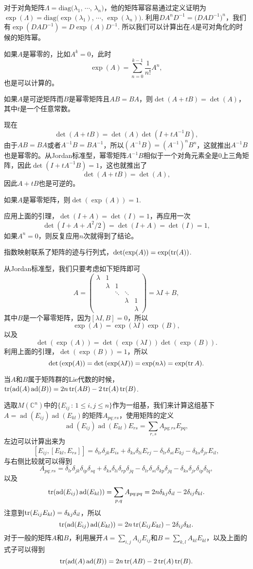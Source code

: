 \documentclass[11pt]{article}
\theoremstyle{definition}
\theoremstyle{plain}
\newcommand{\cc}{\mathbb{C}}
\DeclareMathOperator{\ad}{ad}
\begin{document}
对于对角矩阵$\Lambda=\mathrm{diag}(\lambda_1$, $\cdots$, $\lambda_n)$，他的矩阵幂容易通过定义证明为$\exp(\Lambda)=\mathrm{diag}(\exp(\lambda_1)$, $\cdots$, $\exp(\lambda_n))$. 利用$DA^nD^{-1}=\bigl(DAD^{-1}\bigr)^n$，我们有$\exp(DAD^{-1})=D\exp(A)D^{-1}$. 所以我们可以计算出在$A$是可对角化的时候的矩阵幂。

如果$A$是幂零的，比如$A^k=0$，此时
\[
	\exp(A)=\sum_{n=0}^{k-1} \frac{1}{n!}A^n,
\]
也是可以计算的。

\lem 如果$A$是可逆矩阵而$B$是幂零矩阵且$AB=BA$，则$\det(A+tB)=\det(A)$，其中$t$是一个任意常数。

\proof 现在
\[
	\det(A+tB)=\det(A)\det(I+tA^{-1}B),
\]
由于$AB=BA$或者$A^{-1}B=BA^{-1}$，所以$(A^{-1}B)=(A^{-1})^n B^n$，这就推出$A^{-1}B$也是幂零的。从Jordan标准型，幂零矩阵$A^{-1}B$相似于一个对角元素全是$0$上三角矩阵，因此$\det(I+tA^{-1}B)=1$，这也就推出了
\[
	\det(A+tB)=\det(A),
\]
因此$A+tB$也是可逆的。\endproof

\lem 如果$A$是幂零矩阵，则$\det(\exp(A))=1$.

\proof 应用上面的引理，$\det(I+A)=\det(I)=1$，再应用一次
\[
	\det(I+A+A^2/2)=\det(I+A)=\det(I)=1,
\]
如果$A^n=0$，则反复应用$n$次就得到了结论。\endproof

{\pro 指数映射联系了矩阵的迹与行列式，$\det(\exp(A))=\exp(\operatorname{tr}(A))$.\endpro}

\proof 从Jordan标准型，我们只要考虑如下矩阵即可
\[
	A=\begin{pmatrix}
	\lambda &1&&&\\
	&\lambda&1&&\\
	&&\ddots&\ddots&\\
	&&&\lambda&1\\
	&&&&\lambda
	\end{pmatrix}=\lambda I+ B,
\]
其中$B$是一个幂零矩阵，因为$[\lambda I,B]=0$，所以
\[
	\exp(A)=\exp(\lambda I)\exp(B),
\]
以及
\[
	\det \left(\exp(A)\right)=\det\left(\exp(\lambda I)\right)\det\left(\exp(B)\right).
\]
利用上面的引理，$\det\left(\exp(B)\right)=1$，所以
\[
\det \left(\exp(A)\right)=\det\left(\exp(\lambda I)\right)=\exp(n\lambda)=\exp(\operatorname{tr} A).
\]
\endproof

{\pro 当$A$和$B$属于矩阵群的Lie代数的时候，$\tr(\ad(A)\ad(B))=2n \tr(AB) -2\tr(A)\tr(B)$. \endpro}

\proof 选取$M(\cc^n)$中的$\{E_{ij}\,:\, 1\leq i,j\leq n\}$作为一组基，我们来计算这组基下$A=\ad(E_{ij})\ad(E_{kl})$的矩阵$A_{pq;rs}$，使用矩阵的定义
\[
\ad(E_{ij})\ad(E_{kl})E_{rs}=\sum_{r,s}A_{pq;rs}E_{pq},
\]
左边可以计算出来为
\[
[E_{ij},[E_{kl},E_{rs}]]=\delta_{lr}\delta_{jk}E_{is}+\delta_{ks}\delta_{li}E_{rj}-\delta_{lr}\delta_{si}E_{kj}-\delta_{ks}\delta_{jr}E_{il},
\]
与右侧比较就可以得到
\[
	A_{pq;rs}=\delta_{lr}\delta_{jk}\delta_{ip}\delta_{sq}+\delta_{ks}\delta_{li}\delta_{rp}\delta_{jq}-\delta_{lr}\delta_{si}\delta_{kp}\delta_{jq}-\delta_{ks}\delta_{jr}\delta_{ip}\delta_{lq},
\]
以及
\[
	\tr(\ad(E_{ij})\ad(E_{kl}))=\sum_{p,q}A_{pq;pq}=2n \delta_{kj}\delta_{il}-2\delta_{ij}\delta_{kl}.
\]
注意到$\operatorname{tr}(E_{ij}E_{kl})=\delta_{kj}\delta_{il}$，所以
\[
\tr(\ad(E_{ij})\ad(E_{kl}))=2n \tr(E_{ij}E_{kl}) -2\delta_{ij}\delta_{kl}.
\]
对于一般的矩阵$A$和$B$，利用展开$A=\sum_{i,j}A_{ij}E_{ij}$和$B=\sum_{k,l}A_{kl}E_{kl}$，以及上面的式子可以得到
\[
\tr(\ad(A)\ad(B))=2n \tr(AB) -2\tr(A)\tr(B).
\]\endproof
\end{document}
